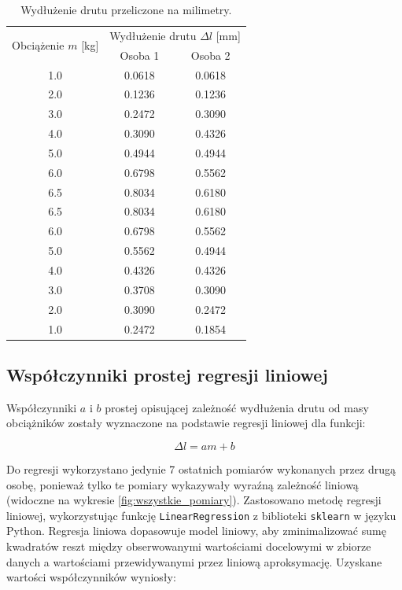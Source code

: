 \documentclass[a4paper,12pt]{article}
\begin{document}
\begin{table}[h]
    \centering
    \begin{tabular}{|c|c|c|}
        \hline
        \multirow{2}{*}{Obciążenie $m$ [kg]} & \multicolumn{2}{c|}{Wydłużenie drutu $\Delta l$ [mm]} \\
        \cline{2-3}
        & Osoba 1 & Osoba 2 \\
        \hline
        1.0  & 0.0618  & 0.0618  \\ \hline
        2.0  & 0.1236  & 0.1236  \\ \hline
        3.0  & 0.2472  & 0.3090  \\ \hline
        4.0  & 0.3090  & 0.4326  \\ \hline
        5.0  & 0.4944  & 0.4944  \\ \hline
        6.0  & 0.6798  & 0.5562  \\ \hline
        6.5  & 0.8034  & 0.6180  \\ \hline
        6.5  & 0.8034  & 0.6180  \\ \hline
        6.0  & 0.6798  & 0.5562  \\ \hline
        5.0  & 0.5562  & 0.4944  \\ \hline
        4.0  & 0.4326  & 0.4326  \\ \hline
        3.0  & 0.3708  & 0.3090  \\ \hline
        2.0  & 0.3090  & 0.2472  \\ \hline
        1.0  & 0.2472  & 0.1854  \\ \hline
    \end{tabular}
    \caption{Wydłużenie drutu przeliczone na milimetry.}
    \label{tab:wydluzenie_drutu}
\end{table}

\subsection{Współczynniki prostej regresji liniowej}

Współczynniki \( a \) i \( b \) prostej opisującej zależność wydłużenia drutu od masy obciążników zostały wyznaczone na podstawie regresji liniowej dla funkcji:

\begin{equation} \label{eq:prosta_regresji}
    \Delta l = a m + b
\end{equation}

Do regresji wykorzystano jedynie 7 ostatnich pomiarów wykonanych przez drugą osobę, ponieważ tylko te pomiary wykazywały wyraźną zależność liniową (widoczne na wykresie \ref{fig:wszystkie_pomiary}). Zastosowano metodę regresji liniowej, wykorzystując funkcję \texttt{LinearRegression} z biblioteki \texttt{sklearn} w języku Python.
Regresja liniowa dopasowuje model liniowy, aby zminimalizować sumę kwadratów reszt między obserwowanymi wartościami docelowymi w zbiorze danych a wartościami przewidywanymi przez liniową aproksymację.
Uzyskane wartości współczynników wyniosły:
\end{document}
